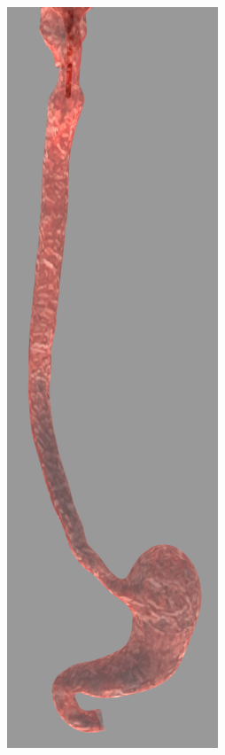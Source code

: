 \documentclass[12pt,a4]{article}
\begin{document}
\begin{figure}[ht!]
\begin{subfigure}{0.15\textwidth}
        \includegraphics[width=0.75\linewidth]{figures/GIsnaps/1.png}
   

\end{subfigure}
\end{figure}
\end{document}

